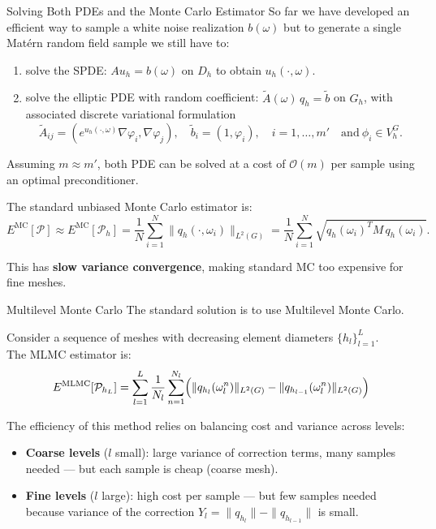 \documentclass[
  english,            %
  aspectratio=169,    %
]{tumbeamer}
\begin{document}

\begin{frame}{Solving Both PDEs and the Monte Carlo Estimator}
So far we have developed an efficient way to sample a white noise realization \(b(\omega)\) but to generate a single Mat\'ern random field sample we still have to:
\bigskip
\begin{enumerate}
  \item solve the SPDE: $Au_h = b(\omega)$ on $D_h$ to obtain $u_h(\cdot,\omega)$.
  \item solve the elliptic PDE with random coefficient: $\tilde{A}(\omega)\,q_h = \tilde{b}$ on $G_h$,
    with associated discrete variational formulation \[\tilde{A}_{ij} = (e^{u_h(\cdot,\omega)}\nabla\varphi_i,\nabla\varphi_j), \quad \tilde{b}_i = (1,\varphi_i), \quad i = 1, \dots, m' \quad \text{and} \ \phi_i \in V_h^G.\]
\end{enumerate}
Assuming $m \approx m'$, both PDE can be solved at a cost of $\mathcal{O}(m)$ per sample using an optimal preconditioner. \\
\smallskip

The standard unbiased Monte Carlo estimator is:
\begin{equation}
  E^{\mathrm{MC}}[\mathcal{P}] \approx E^{\mathrm{MC}}[\mathcal{P}_h]
  = \frac{1}{N}\sum_{i=1}^N \|q_h(\cdot,\omega_i)\|_{L^2(G)}
  = \frac{1}{N}\sum_{i=1}^N \sqrt{q_h(\omega_i)^T M\, q_h(\omega_i)}.
\end{equation}

This has \textbf{slow variance convergence}, making standard MC too expensive for fine meshes. 

\end{frame}


\begin{frame}{Multilevel Monte Carlo}
The standard solution is to use Multilevel Monte Carlo. 
\smallskip

Consider a sequence of meshes with decreasing element diameters $\{h_l\}_{l=1}^L$. \\
The MLMC estimator is:
\begin{equation}
  E^{\mathrm{MLMC}}[\mathcal{P}_{h_L}]
  = \sum_{l=1}^{L} \frac{1}{N_l}\sum_{n=1}^{N_l}
    \Bigl(\|q_{h_l}(\omega_l^n)\|_{L^2(G)} - \|q_{h_{l-1}}(\omega_l^n)\|_{L^2(G)}\Bigr)
\end{equation}

\bigskip
The efficiency of this method relies on balancing cost and variance across levels:
\begin{itemize}
  \item \textbf{Coarse levels} ($l$ small): large variance of correction terms,
    many samples needed — but each sample is cheap (coarse mesh).
  \item \textbf{Fine levels} ($l$ large): high cost per sample — but few samples
    needed because variance of the correction $Y_l = \|q_{h_l}\| - \|q_{h_{l-1}}\|$ is small.
\end{itemize}

\end{frame}
\end{document}
